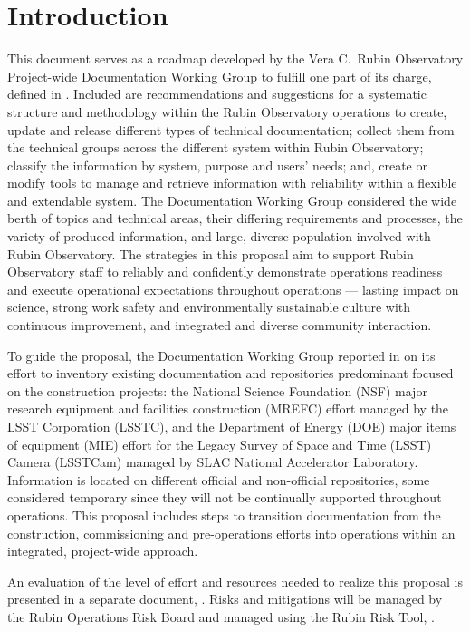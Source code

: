 \section{Introduction}

This document serves as a roadmap developed by the Vera C.\ Rubin Observatory Project-wide Documentation Working Group to fulfill one part of its charge,  defined in .
Included are recommendations and suggestions for a systematic structure and methodology within the Rubin Observatory operations to create, update and release different types of technical documentation; collect them from the technical groups across the different system within Rubin Observatory; classify the information by system, purpose and users' needs; and, create or modify tools to manage and retrieve information with reliability within a flexible and extendable system.
The Documentation Working Group considered the wide berth of topics and technical areas, their differing requirements and processes, the variety of produced information, and large, diverse population involved with Rubin Observatory.
The strategies in this proposal aim to support Rubin Observatory staff to reliably and confidently demonstrate operations readiness  and execute operational expectations throughout operations --- lasting impact on science, strong work safety and environmentally sustainable culture with continuous improvement, and integrated and diverse community interaction.

To guide the proposal, the Documentation Working Group reported in  on its effort to inventory existing documentation and repositories predominant focused on the construction projects: the National Science Foundation (NSF) major research equipment and facilities construction (MREFC) effort managed by the LSST Corporation (LSSTC), and the Department of Energy (DOE) major items of equipment (MIE) effort for the Legacy Survey of Space and Time (LSST) Camera (LSSTCam) managed by SLAC National Accelerator Laboratory.
Information is located on different official and non-official repositories, some considered temporary since they will not be continually supported throughout operations.
This proposal includes steps to transition documentation from the construction, commissioning and pre-operations efforts into operations within an integrated, project-wide approach.

An evaluation of the level of effort and resources needed to realize this proposal is presented in a separate document, . 
Risks and mitigations will be managed by the Rubin Operations Risk Board and managed using the Rubin Risk Tool, .


